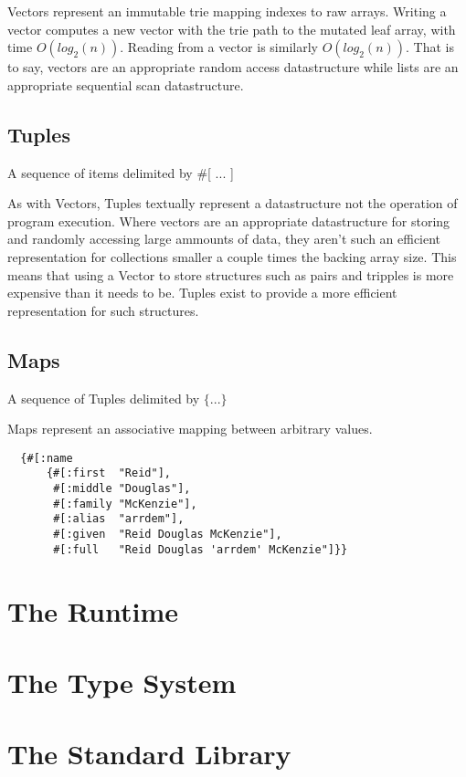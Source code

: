 \documentclass{report}
\begin{document}
Vectors represent an immutable trie mapping indexes to raw arrays. Writing a
vector computes a new vector with the trie path to the mutated leaf array,
with time $O(log_2(n))$. Reading from a vector is similarly
$O(log_2(n))$. That is to say, vectors are an appropriate random access
datastructure while lists are an appropriate sequential scan datastructure.

\section{Tuples}


A sequence of items delimited by \#[ ... ]

As with Vectors, Tuples textually represent a datastructure not the operation
of program execution. Where vectors are an appropriate datastructure for
storing and randomly accessing large ammounts of data, they aren't such an
efficient representation for collections smaller a couple times the backing
array size. This means that using a Vector to store structures such as pairs
and tripples is more expensive than it needs to be. Tuples exist to provide a
more efficient representation for such structures.

\section{Maps}


A sequence of Tuples delimited by $\{ ... \}$

Maps represent an associative mapping between arbitrary values.

\begin{lstlisting}
  {#[:name
      {#[:first  "Reid"],
       #[:middle "Douglas"],
       #[:family "McKenzie"],
       #[:alias  "arrdem"],
       #[:given  "Reid Douglas McKenzie"],
       #[:full   "Reid Douglas 'arrdem' McKenzie"]}}
\end{lstlisting}

\chapter{The Runtime}


\chapter{The Type System}


\chapter{The Standard Library}

\end{document}
